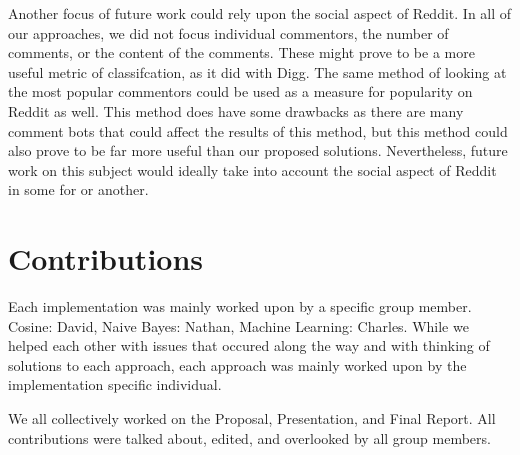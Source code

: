 \documentclass{acm_proc_article-sp}
\begin{document}
Another focus of future work could rely upon the social aspect of Reddit. In all of our approaches, we did not focus individual commentors, the number of comments, or the content of the comments. These might prove to be a more useful metric of classifcation, as it did with Digg. The same method of looking at the most popular commentors could be used as a measure for popularity on Reddit as well. This method does have some drawbacks as there are many comment bots that could affect the results of this method, but this method could also prove to be far more useful than our proposed solutions. Nevertheless, future work on this subject would ideally take into account the social aspect of Reddit in some for or another.

\section{Contributions}
Each implementation was mainly worked upon by a specific group member. Cosine: David, Naive Bayes: Nathan, Machine Learning: Charles. While we helped each other with issues that occured along the way and with thinking of solutions to each approach, each approach was mainly worked upon by the implementation specific individual. 

We all collectively worked on the Proposal, Presentation, and Final Report. All contributions were talked about, edited, and overlooked by all group members.

%

%
%


\end{document}
